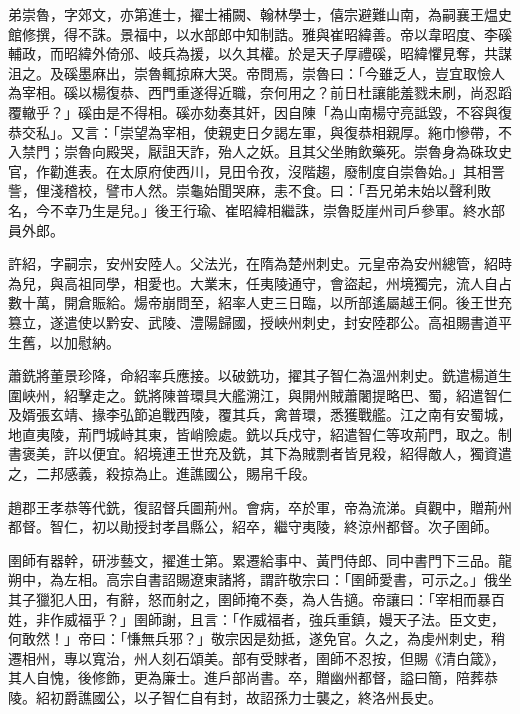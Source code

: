 \begin{pinyinscope}
 弟崇魯，字郊文，亦第進士，擢士補闕、翰林學士，僖宗避難山南，為嗣襄王煴史館修撰，得不誅。景福中，以水部郎中知制誥。雅與崔昭緯善。帝以韋昭度、李磎輔政，而昭緯外倚邠、岐兵為援，以久其權。於是天子厚禮磎，昭緯懼見奪，共謀沮之。及磎墨麻出，崇魯輒掠麻大哭。帝問焉，崇魯曰：「今雖乏人，豈宜取憸人為宰相。磎以楊復恭、西門重遂得近職，奈何用之？前日杜讓能羞戮未刷，尚忍蹈覆轍乎？」磎由是不得相。磎亦劾奏其奸，因自陳「為山南楊守亮詆毀，不容與復恭交私」。又言：「崇望為宰相，使親吏日夕謁左軍，與復恭相親厚。絁巾慘帶，不入禁門；崇魯向殿哭，厭詛天詐，殆人之妖。且其父坐賄飲藥死。崇魯身為硃玫史官，作勸進表。在太原府使西川，見田令孜，沒階趨，廢制度自崇魯始。」其相詈訾，俚淺稽校，譬市人然。崇龜始聞哭麻，恚不食。曰：「吾兄弟未始以聲利敗名，今不幸乃生是兒。」後王行瑜、崔昭緯相繼誅，崇魯貶崖州司戶參軍。終水部員外郎。



 許紹，字嗣宗，安州安陸人。父法光，在隋為楚州刺史。元皇帝為安州總管，紹時為兒，與高祖同學，相愛也。大業末，任夷陵通守，會盜起，州境獨完，流人自占數十萬，開倉賑給。煬帝崩問至，紹率人吏三日臨，以所部遙屬越王侗。後王世充篡立，遂遣使以黔安、武陵、澧陽歸國，授峽州刺史，封安陸郡公。高祖賜書道平生舊，以加慰納。



 蕭銑將董景珍降，命紹率兵應接。以破銑功，擢其子智仁為溫州刺史。銑遣楊道生圍峽州，紹擊走之。銑將陳普環具大艦溯江，與開州賊蕭闍提略巴、蜀，紹遣智仁及婿張玄靖、掾李弘節追戰西陵，覆其兵，禽普環，悉獲戰艦。江之南有安蜀城，地直夷陵，荊門城峙其東，皆峭險處。銑以兵戍守，紹遣智仁等攻荊門，取之。制書褒美，許以便宜。紹境連王世充及銑，其下為賊剽者皆見殺，紹得敵人，獨資遣之，二邦感義，殺掠為止。進譙國公，賜帛千段。



 趙郡王孝恭等代銑，復詔督兵圖荊州。會病，卒於軍，帝為流涕。貞觀中，贈荊州都督。智仁，初以勛授封孝昌縣公，紹卒，繼守夷陵，終涼州都督。次子圉師。



 圉師有器幹，研涉藝文，擢進士第。累遷給事中、黃門侍郎、同中書門下三品。龍朔中，為左相。高宗自書詔賜遼東諸將，謂許敬宗曰：「圉師愛書，可示之。」俄坐其子獵犯人田，有辭，怒而射之，圉師掩不奏，為人告擿。帝讓曰：「宰相而暴百姓，非作威福乎？」圉師謝，且言：「作威福者，強兵重鎮，嫚天子法。臣文吏，何敢然！」帝曰：「慊無兵邪？」敬宗因是劾抵，遂免官。久之，為虔州刺史，稍遷相州，專以寬治，州人刻石頌美。部有受賕者，圉師不忍按，但賜《清白箴》，其人自愧，後修飾，更為廉士。進戶部尚書。卒，贈幽州都督，謚曰簡，陪葬恭陵。紹初爵譙國公，以子智仁自有封，故詔孫力士襲之，終洛州長史。




\end{pinyinscope}
